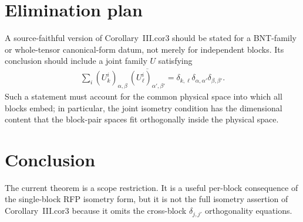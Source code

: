 \documentclass{article}
\begin{document}
\section{Elimination plan}

A source-faithful version of Corollary~III.cor3 should be stated for a
BNT-family or whole-tensor canonical-form datum, not merely for independent
blocks.  Its conclusion should include a joint family $U$ satisfying
\begin{align}
  \sum_i
  (U_k^i)_{\alpha,\beta}\,
  \overline{(U_\ell^i)_{\alpha',\beta'}}
  =
  \delta_{k,\ell}\delta_{\alpha,\alpha'}\delta_{\beta,\beta'}.
\end{align}
Such a statement must account for the common physical space into which all
blocks embed; in particular, the joint isometry condition has the dimensional
content that the block-pair spaces fit orthogonally inside the physical space.

\section{Conclusion}

The current theorem is a scope restriction.  It is a useful per-block
consequence of the single-block RFP isometry form, but it is not the full
isometry assertion of Corollary~III.cor3 because it omits the cross-block
$\delta_{j,j'}$ orthogonality equations.



\end{document}
